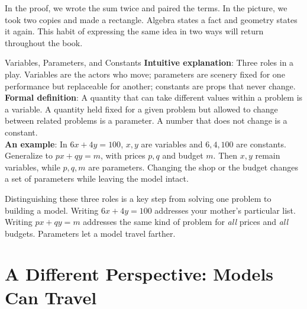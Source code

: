 \begin{center}
\end{center}

In the proof, we wrote the sum twice and paired the terms. In the picture, we took two copies and made a rectangle. Algebra states a fact and geometry states it again. This habit of expressing the same idea in two ways will return throughout the book.

\begin{shuyu}{Variables, Parameters, and Constants}
\textbf{Intuitive explanation}: Three roles in a play. Variables are the actors who move; parameters are scenery fixed for one performance but replaceable for another; constants are props that never change.\\
\textbf{Formal definition}: A quantity that can take different values within a problem is a variable. A quantity held fixed for a given problem but allowed to change between related problems is a parameter. A number that does not change is a constant.\\
\textbf{An example}: In $6x+4y=100$, $x,y$ are variables and $6,4,100$ are constants. Generalize to $px+qy=m$, with prices $p,q$ and budget $m$. Then $x,y$ remain variables, while $p,q,m$ are parameters. Changing the shop or the budget changes a set of parameters while leaving the model intact.
\end{shuyu}

Distinguishing these three roles is a key step from solving one problem to building a model. Writing $6x+4y=100$ addresses your mother's particular list. Writing $px+qy=m$ addresses the same kind of problem for \emph{all} prices and \emph{all} budgets. Parameters let a model travel farther.

\section{A Different Perspective: Models Can Travel}

